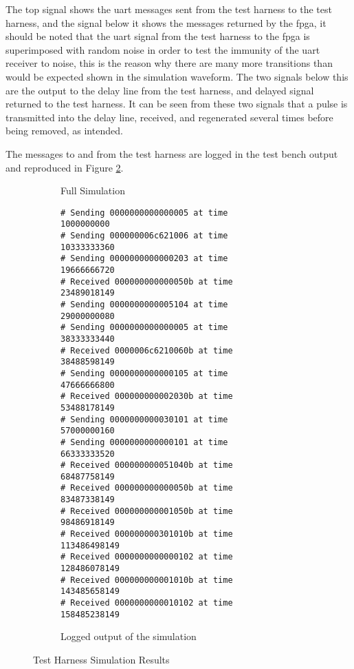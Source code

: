 The top signal shows the \gls{uart} messages sent from the test harness to the test harness, and the signal below it shows the messages returned by the \gls{fpga}, it should be noted that the \gls{uart} signal from the test harness to the \gls{fpga} is superimposed with random noise in order to test the immunity of the \gls{uart} receiver to noise, this is the reason why there are many more transitions than would be expected shown in the simulation waveform. The two signals below this are the output to the delay line from the test harness, and delayed signal returned to the test harness. It can be seen from these two signals that a pulse is transmitted into the delay line, received, and regenerated several times before being removed, as intended.

The messages to and from the test harness are logged in the test bench output and reproduced in Figure \ref{fig:harness-sim-log}.

 \begin{figure}[ht]
	\centering
	
	\begin{subfigure}[b]{\textwidth}
		\centering
		\caption{Full Simulation}
		\label{fig:harness-full}
	\end{subfigure}
	
	\begin{subfigure}[b]{\textwidth}
		\centering
		\begin{lstlisting}
# Sending 0000000000000005 at time           1000000000
# Sending 000000006c621006 at time          10333333360
# Sending 0000000000000203 at time          19666666720
# Received 000000000000050b at time          23489018149
# Sending 0000000000005104 at time          29000000080
# Sending 0000000000000005 at time          38333333440
# Received 0000006c6210060b at time          38488598149
# Sending 0000000000000105 at time          47666666800
# Received 000000000002030b at time          53488178149
# Sending 0000000000030101 at time          57000000160
# Sending 0000000000000101 at time          66333333520
# Received 000000000051040b at time          68487758149
# Received 000000000000050b at time          83487338149
# Received 000000000001050b at time          98486918149
# Received 000000000301010b at time         113486498149
# Received 0000000000000102 at time         128486078149
# Received 000000000001010b at time         143485658149
# Received 0000000000010102 at time         158485238149
		\end{lstlisting}
		\caption{Logged output of the simulation}
		\label{fig:harness-sim-log}
	\end{subfigure}
	
	\caption{Test Harness Simulation Results}
	\label{fig:harness-sim}
\end{figure}



